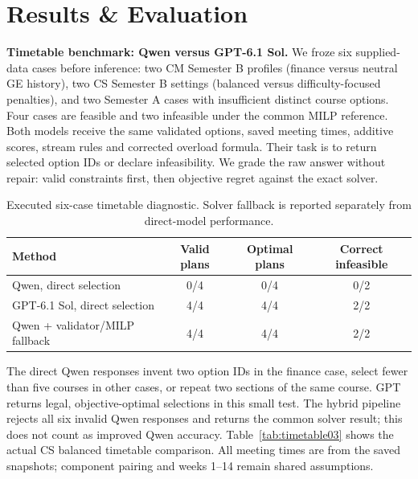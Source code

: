 \documentclass{article}
\begin{document}
\newpage
\section{Results \& Evaluation}

\textbf{Timetable benchmark: Qwen versus GPT-6.1 Sol.} We froze six supplied-data cases before inference: two CM Semester B profiles (finance versus neutral GE history), two CS Semester B settings (balanced versus difficulty-focused penalties), and two Semester A cases with insufficient distinct course options. Four cases are feasible and two infeasible under the common MILP reference. Both models receive the same validated options, saved meeting times, additive scores, stream rules and corrected overload formula. Their task is to return selected option IDs or declare infeasibility. We grade the raw answer without repair: valid constraints first, then objective regret against the exact solver.

\begin{table}[H]
\centering\small
\caption{Executed six-case timetable diagnostic. Solver fallback is reported separately from direct-model performance.}
\begin{tabular}{p{2.6in}ccc}
\toprule
Method & Valid plans & Optimal plans & Correct infeasible\\
\midrule
Qwen, direct selection & 0/4 & 0/4 & 0/2\\
GPT-6.1 Sol, direct selection & 4/4 & 4/4 & 2/2\\
Qwen + validator/MILP fallback & 4/4 & 4/4 & 2/2\\
\bottomrule
\end{tabular}
\label{tab:benchmark03}
\end{table}

The direct Qwen responses invent two option IDs in the finance case, select fewer than five courses in other cases, or repeat two sections of the same course. GPT returns legal, objective-optimal selections in this small test. The hybrid pipeline rejects all six invalid Qwen responses and returns the common solver result; this does not count as improved Qwen accuracy. Table~\ref{tab:timetable03} shows the actual CS balanced timetable comparison. All meeting times are from the saved snapshots; component pairing and weeks 1--14 remain shared assumptions.
\end{document}
